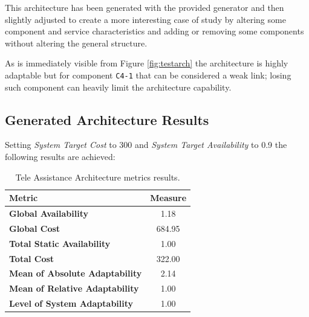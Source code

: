 This architecture has been generated with the provided generator and then slightly adjusted to create a more interesting case of study by altering some component and service characteristics and adding or removing some components without altering the general structure.

As is immediately visible from Figure \ref{fig:testarch} the architecture is highly adaptable but for component \texttt{C4-1} that can be considered a weak link; losing such component can heavily limit the architecture capability. 

\clearpage
\subsection{Generated Architecture Results}

Setting \emph{System Target Cost} to 300 and \emph{System Target Availability} to 0.9 the following results are achieved:

\begin{table}[ht!b]
	\centering
	\begin{tabular}{|l|c|}
		\hline
		Metric & Measure \\
		\hline 
		\textbf{Global Availability} & 1.18 \\ 
		\hline 
		\textbf{Global Cost} & 684.95 \\
		\hline 
		\textbf{Total Static Availability} & 1.00 \\
		\hline 
		\textbf{Total Cost} & 322.00 \\
		\hline 
		\textbf{Mean of Absolute Adaptability} & 2.14 \\
		\hline
		\textbf{Mean of Relative Adaptability} & 1.00 \\
		\hline
		\textbf{Level of System Adaptability} & 1.00 \\
		\hline
	\end{tabular} 
	\caption[TAS Service Architecture Metrics]{Tele Assistance Architecture metrics results.}
	\label{tab:ag-arch-res}
\end{table}

